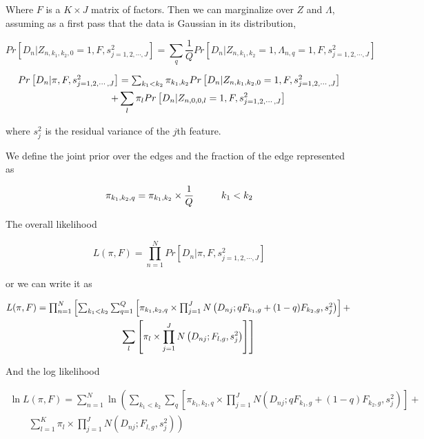 \documentclass[12pt]{article}
\begin{document}
Where $F$ is a $K\times J$ matrix of factors. 
Then we can marginalize over $Z$ and $\Lambda$, assuming as a first pass 
that the data is Gaussian in its distribution,

$$ Pr \left [ D_{n} | Z_{n, k_1, k_2,0}=1, F, s^2_{j=1,2,\cdots,J} \right ] = \sum_{q} \frac{1}{Q} Pr \left [D_{n} | Z_{n, k_1, k_2}=1, \Lambda_{n, q}=1, F, s^2_{j=1,2,\cdots,J} \right ] $$

\begin{multline}
 $$ Pr \left [ D_{n} | \pi, F, s^2_{j=1,2,\cdots,J} \right ] = \sum_{k_1 < k_2}
 \pi_{k_1, k_2} Pr \left [ D_{n} | Z_{n, k_1, k_2, 0}=1,  F, s^2_{j=1,2,\cdots,J} \right ]  \\
   \qquad \qquad +  \sum_{l} \pi_{l} Pr \left [ D_{n} | Z_{n, 0, 0, l}=1,  F, s^2_{j=1,2,\cdots,J} \right ]$$
 \end{multline}
 
 

where $s^2_{j}$ is the residual variance of the $j$th feature.
 
We define the joint prior over the edges and the fraction of the edge represented as 

$$ \pi_{k_1,k_2, q} = \pi_{k_1, k_2} \times \frac{1}{Q} \hspace{1 cm} k_1 < k_2 $$

The overall likelihood 

$$ L(\pi, F) = \prod_{n=1}^{N} Pr \left [ D_{n} | \pi, F, s^2_{j=1,2,\cdots,J} \right ] $$

or we can write it as 

\begin{multline}
$$L(\pi, F) = \prod_{n=1}^{N} \left [ \sum_{k_1 < k_2} \sum_{q=1}^{Q} \left [ \pi_{k_1,k_2, q} \times \prod_{j=1}^{J} N \left (D_{nj}; q F_{k_1,g} + (1-q) F_{k_2, g}, s^2_{j} \right) \right ]   + \right. \\
\left.   \qquad \sum_{l} \left [ \pi_{l} \times \prod_{j=1}^{J} N \left (D_{nj}; F_{l,g} , s^2_{j} \right) \right ] \right]$$
\end{multline}

And the log likelihood

\begin{multline}
\ln {L (\pi, F)} = \sum_{n=1}^{N} \ln \left (\sum_{k_1 < k_2} \sum_{q} \left [ \pi_{k_1,k_2, q} \times \prod_{j=1}^{J} N \left (D_{nj}; q F_{k_1,g} + (1-q) F_{k_2, g}, s^2_{j} \right) \right ] + \right . \\
\left. \qquad \sum_{l=1}^{K} \pi_{l}  \times \prod_{j=1}^{J} N \left (D_{nj}; F_{l,g}, s^2_{j} \right)\right )
\end{multline}
\end{document}
